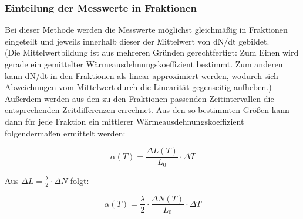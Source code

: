 \subsubsection{Einteilung der Messwerte in Fraktionen}
Bei dieser Methode werden die Messwerte möglichst gleichmäßig in Fraktionen eingeteilt und jeweils innerhalb dieser der Mittelwert von dN/dt gebildet.\\(Die Mittelwertbildung ist aus mehreren Gründen gerechtfertigt: Zum Einen wird gerade ein gemittelter Wärmeausdehnungskoeffizient bestimmt. Zum anderen kann dN/dt in den Fraktionen als linear approximiert werden, wodurch sich Abweichungen vom Mittelwert durch die Linearität gegenseitig aufheben.) Außerdem werden aus den zu den Fraktionen passenden Zeitintervallen die entsprechenden Zeitdifferenzen errechnet. Aus den so bestimmten Größen kann dann für jede Fraktion ein mittlerer Wärmeausdehnungskoeffizient folgendermaßen ermittelt werden:

\begin{equation}
\alpha(T)=\frac{\Delta L(T)}{L_{0}} \cdot \Delta T
\end{equation}

Aus $ \Delta L = \frac{\lambda}{2} \cdot \Delta N $ folgt:

\begin{equation}
\alpha (T)= \frac{\lambda}{2} \cdot \frac{\Delta N(T)}{L_0} \cdot \Delta T
\end{equation}

